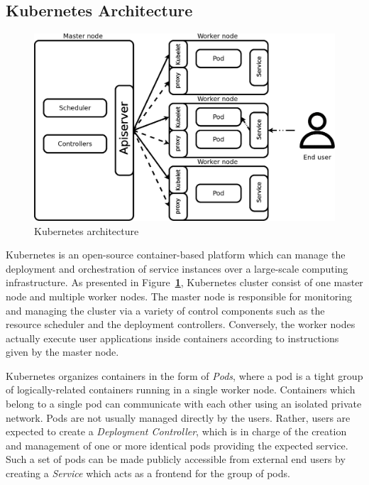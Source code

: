 \documentclass[letterpaper,twocolumn,10pt]{article}
\let\origref\ref
\def\ref#1{\textbf{\origref{#1}}}
\begin{document}
\subsection{Kubernetes Architecture}

\begin{figure}[t]
  \centering
  \includegraphics[width=\linewidth]{images/arch.png}
  \caption{Kubernetes architecture} 
  \label{fig:arch}
\end{figure}

Kubernetes is an open-source container-based platform which can manage
the deployment and orchestration of service instances over a
large-scale computing infrastructure. As presented in
Figure~\ref{fig:arch}, Kubernetes cluster consist of one master node
and multiple worker nodes. The master node is responsible for
monitoring and managing the cluster via a variety of control
components such as the resource scheduler and the deployment
controllers. Conversely, the worker nodes actually execute user
applications inside containers according to instructions given by the
master node.

Kubernetes organizes containers in the form of \emph{Pods}, where a
pod is a tight group of logically-related containers running in a
single worker node. Containers which belong to a single pod can
communicate with each other using an isolated private network. Pods
are not usually managed directly by the users. Rather, users are
expected to create a \emph{Deployment Controller}, which is in charge
of the creation and management of one or more identical pods providing
the expected service. Such a set of pods can be made publicly
accessible from external end users by creating a \emph{Service} which
acts as a frontend for the group of pods.
\end{document}
